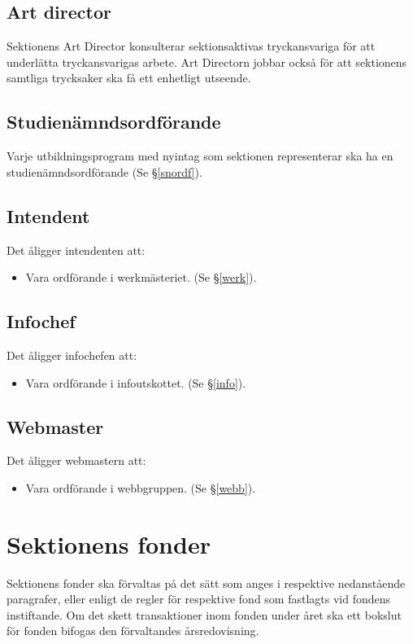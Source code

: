 \documentclass{datateknologsektionen-document}
\begin{document}
\subsection{Art director}
\label{ad}
Sektionens Art Director konsulterar sektionsaktivas tryckansvariga för att underlätta
tryckansvarigas arbete. Art Directorn jobbar också för att sektionens samtliga trycksaker ska få ett
enhetligt utseende.

\subsection{Studienämndsordförande}
Varje utbildningsprogram med nyintag som sektionen representerar ska ha en
studienämndsordförande (Se \S \ref{snordf}).

\subsection{Intendent}
\label{intendent}
Det åligger intendenten att:
\begin{itemize}
  \item Vara ordförande i werkmästeriet. (Se \S \ref{werk}).
\end{itemize}

\subsection{Infochef}
\label{infochef}
Det åligger infochefen att:
\begin{itemize}
  \item Vara ordförande i infoutskottet. (Se \S \ref{info}).
\end{itemize}

\subsection{Webmaster}
\label{webmaster}
Det åligger webmastern att:
\begin{itemize}
  \item Vara ordförande i webbgruppen. (Se \S \ref{webb}).
\end{itemize}

\section{Sektionens fonder}
\label{fonder}
Sektionens fonder ska förvaltas på det sätt som anges i respektive nedanstående paragrafer, eller
enligt de regler för respektive fond som fastlagts vid fondens instiftande. Om det skett
transaktioner inom fonden under året ska ett bokslut för fonden bifogas den förvaltandes
årsredovisning.
\end{document}
